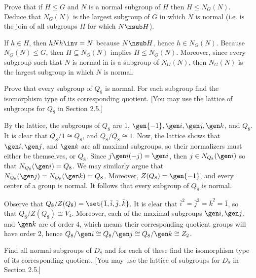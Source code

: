 \begin{exercise}\label{ex3.1.31}
    Prove that if $H \le G$ and $N$ is a normal subgroup of $H$ then $H \le N_G(N)$. Deduce that $N_G(N)$ is the largest subgroup of $G$ in which $N$ is normal (i.e. is the join of all subgroups $H$ for which $N \nsub H$).
\end{exercise}

\begin{sol}
    If $h \in H$, then $hNh\inv = N$ because $N \nsub H$, hence $h \in N_G(N)$. Because $N_G(N) \leq G$, then $H \subseteq N_G(N)$ implies $H \leq N_G(N)$. Moreover, since every subgroup such that $N$ is normal in is a subgroup of $N_G(N)$, then $N_G(N)$ is the largest subgroup in which $N$ is normal.
\end{sol}

\begin{exercise}\label{ex3.1.32}
    Prove that every subgroup of $Q_8$ is normal. For each subgroup find the isomorphism type of its corresponding quotient. [You may use the lattice of subgroups for $Q_8$ in Section 2.5.]
\end{exercise}

\begin{sol}
    By the lattice, the subgroups of $Q_8$ are 1, $\gen{-1}, \gen i, \gen j, \gen k$, and $Q_8$. It is clear that $Q_8/1 \cong Q_8$, and $Q_8/Q_8 \cong 1$. Now, the lattice shows that $\gen i, \gen j$, and $\gen k$ are all maximal subgroups, so their normalizers must either be themselves, or $Q_8$. Since $j\gen i (-j) = \gen i$, then $j \in N_{Q_8}(\gen i)$ so that $N_{Q_8}(\gen i) = Q_8$. We may similarly argue that $N_{Q_8}(\gen j) = N_{Q_8}(\gen k) = Q_8$. Moreover, $Z(Q_8) = \gen{-1}$, and every center of a group is normal. It follows that every subgroup of $Q_8$ is normal.
    
    Observe that $Q_8/Z(Q_8) = \set{\bar 1, \bar i, \bar j, \bar k}$. It is clear that $\bar i^2 = \bar j^2 = \bar k^2 = \bar 1$, so that $Q_8/Z(Q_8) \cong V_4$. Moreover, each of the maximal subgroups $\gen i, \gen j$, and $\gen k$ are of order 4, which means their corresponding quotient groups will have order 2, hence $Q_8/\gen i \cong Q_8/\gen j \cong Q_8/\gen k \cong Z_2$.
\end{sol}

\begin{exercise}\label{ex3.1.33}
    Find all normal subgroups of $D_8$ and for each of these find the isomorphism type of its corresponding quotient. [You may use the lattice of subgroups for $D_8$ in Section 2.5.]
\end{exercise}

